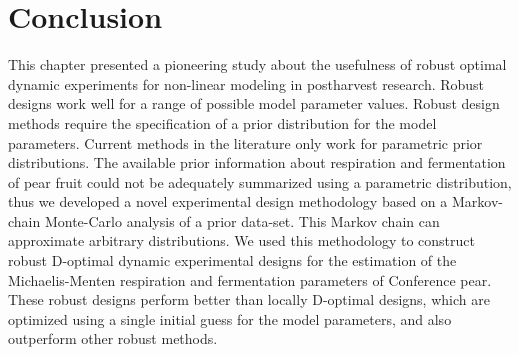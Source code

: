 \section{Conclusion}
This chapter presented a pioneering study about the usefulness of robust optimal dynamic experiments for non-linear modeling in postharvest research. Robust designs work well for a range of possible model parameter values. Robust design methods require the specification of a prior distribution for the model parameters. Current methods in the literature only work for parametric prior distributions. The available prior information about respiration and fermentation of pear fruit could not be adequately summarized using a parametric distribution, thus we developed a novel experimental design methodology based on a Markov-chain Monte-Carlo analysis of a prior data-set. This Markov chain can approximate arbitrary distributions. We used this methodology to construct robust D-optimal dynamic experimental designs for the estimation of the Michaelis-Menten respiration and fermentation parameters of Conference pear. These robust designs perform better than locally D-optimal designs, which are optimized using a single initial guess for the model parameters, {\color{red}and also outperform other robust methods}.